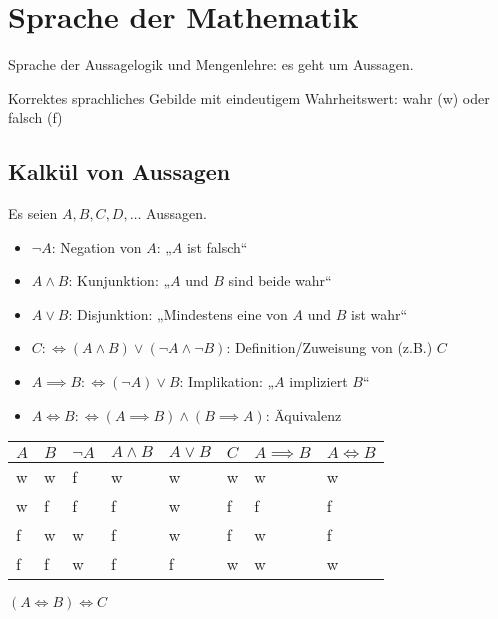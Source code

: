 
\chapter{Sprache der Mathematik}

Sprache der Aussagelogik und Mengenlehre: es geht um Aussagen.

\begin{definition}
  Korrektes sprachliches Gebilde mit eindeutigem Wahrheitswert: wahr (w) oder falsch (f)
\end{definition}

\section{Kalkül von Aussagen}
Es seien $A, B, C, D, \dots $ Aussagen.

\begin{itemize}
\item $\neg A$: Negation von $A$: „$A$ ist falsch“
\item $A \wedge B$: Kunjunktion: „$A$ und $B$ sind beide wahr“
\item $A \vee B$: Disjunktion: „Mindestens eine von $A$ und $B$ ist wahr“
\item $C :\iff (A \wedge B) \vee (\neg A \wedge \neg B)$: Definition/Zuweisung von (z.B.) $C$
\item $A \implies B :\iff (\neg A) \vee B$: Implikation: „$A$ impliziert  $B$“
\item $A \iff B :\iff (A \implies B) \wedge (B \implies A)$: Äquivalenz
\end{itemize}

\begin{tabularx}{1.0\linewidth}{|X|X|X|X|X|X|X|X|}
  \hline
  $A$&$B$&$\neg A$&$A \wedge B$&$A \vee B$&$C$&$A \implies B$&$A \iff B$\\\hline
  w & w & f & w & w & w & w & w \\
  w & f & f & f & w & f & f & f \\
  f & w & w & f & w & f & w & f \\
  f & f & w & f & f & w & w & w \\\hline
\end{tabularx}

\begin{remark}
  $(A \iff B) \iff C$
\end{remark}

